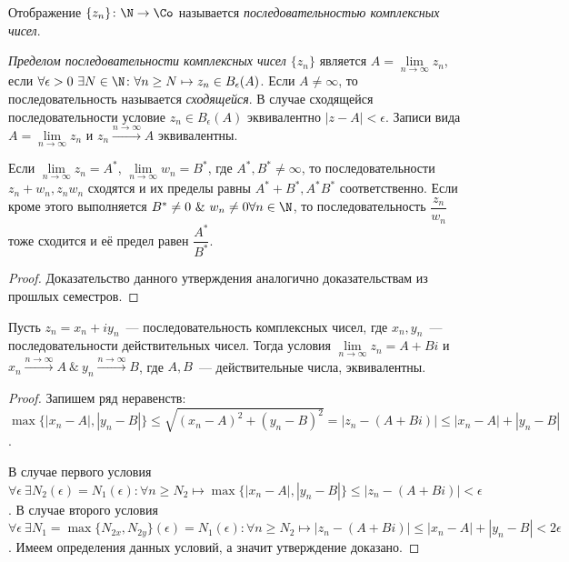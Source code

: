 
\begin{definition}
Отображение \(\{z_n\} \colon \N \to \Co\) называется \textit{последовательностью комплексных чисел}.
\end{definition}

\begin{definition}
\textit{Пределом последовательности комплексных чисел \(\{z_n\}\)} является \(A = \lim\limits_{n \to
\infty} z_n\), если \(\forall \epsilon > 0 \ \exists N \in \N \colon \forall n \ge N \mapsto z_n \in
B_\epsilon(A)\). Если \(A \ne \infty\), то последовательность называется \textit{сходящейся}. В
случае сходящейся последовательности условие \(z_n \in B_\epsilon(A)\) эквивалентно \(|z-A| <
\epsilon\). Записи вида \(A = \lim\limits_{n \to \infty} z_n\) и \(z_n \xrightarrow{n \to \infty}
A\) эквивалентны.
\end{definition}

\begin{statement}\label{7:arithmetic_properties}
Если \(\lim\limits_{n \to \infty} z_n = A^*\), \(\lim\limits_{n \to \infty} w_n = B^*\), где \(A^*,
B^* \ne \infty\), то последовательности \(z_n + w_n, z_nw_n\) сходятся и их пределы равны \(A^* +
B^*, A^*B^*\) соответственно. Если кроме этого выполняется \(B^* \ne 0 \ \& \ w_n \ne 0 \forall n
\in \N\), то последовательность \(\dfrac{z_n}{w_n}\) тоже сходится и её предел равен
\(\dfrac{A^*}{B^*}\).
\end{statement}

\begin{proof}
Доказательство данного утверждения аналогично доказательствам из прошлых семестров.
\end{proof}

\begin{statement}\label{7:complex_to_real}
Пусть \(z_n = x_n + iy_n\)~--- последовательность комплексных чисел, где \(x_n, y_n\)~---
последовательности действительных чисел. Тогда условия \(\lim\limits_{n \to \infty} z_n = A + Bi\) и
\(x_n \xrightarrow{n \to \infty} A \ \& \ y_n \xrightarrow{n \to \infty} B\), где \(A, B\)~---
действительные числа, эквивалентны.
\end{statement}

\begin{proof}
Запишем ряд неравенств: \(\max \{|x_n -A|, |y_n - B|\} \le \sqrt{(x_n-A)^2 + (y_n - B)^2} = |z_n -
(A+Bi)| \le |x_n - A| + |y_n - B|\).

В случае первого условия \(\forall \epsilon \ \exists N_2 (\epsilon) = N_1(\epsilon) \colon \forall
n \ge N_2 \mapsto \max \{|x_n -A|, |y_n - B|\} \le |z_n - (A+Bi)| < \epsilon\). В случае второго
условия \(\forall \epsilon \ \exists N_1 = \max \{N_{2x}, N_{2y}\} (\epsilon) = N_1(\epsilon) \colon
\forall n \ge N_2 \mapsto|z_n - (A+Bi)| \le |x_n - A| + |y_n - B| < 2\epsilon\). Имеем определения
данных условий, а значит утверждение доказано.
\end{proof}

